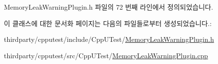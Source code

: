 Memory\+Leak\+Warning\+Plugin.\+h 파일의 72 번째 라인에서 정의되었습니다.



이 클래스에 대한 문서화 페이지는 다음의 파일들로부터 생성되었습니다.\+:\begin{DoxyCompactItemize}
\item 
thirdparty/cpputest/include/\+Cpp\+U\+Test/\hyperlink{_memory_leak_warning_plugin_8h}{Memory\+Leak\+Warning\+Plugin.\+h}\item 
thirdparty/cpputest/src/\+Cpp\+U\+Test/\hyperlink{_memory_leak_warning_plugin_8cpp}{Memory\+Leak\+Warning\+Plugin.\+cpp}\end{DoxyCompactItemize}
